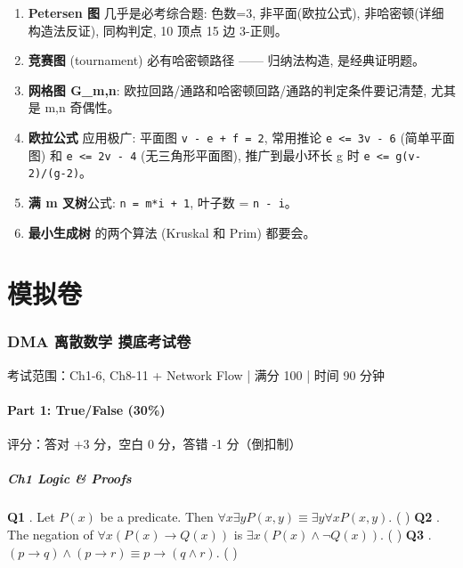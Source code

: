 \documentclass[10pt,a4paper,openany]{ctexbook}
\theoremstyle{definition}
\theoremstyle{remark}
\renewenvironment{quote}
  {\list{}{\leftmargin=1em\rightmargin=0pt\topsep=0.5pt\partopsep=0pt}\item[]}
  {\endlist}
\begin{document}
\begin{enumerate}
\item \textbf{Petersen 图} 几乎是必考综合题: 色数=3, 非平面(欧拉公式), 非哈密顿(详细构造法反证), 同构判定, 10 顶点 15 边 3-正则。
\item \textbf{竞赛图} (tournament) 必有哈密顿路径 —— 归纳法构造, 是经典证明题。
\item \textbf{网格图 G\_{m,n}}: 欧拉回路/通路和哈密顿回路/通路的判定条件要记清楚, 尤其是 m,n 奇偶性。
\item \textbf{欧拉公式} 应用极广: 平面图 \texttt{v - e + f = 2}, 常用推论 \texttt{e <= 3v - 6} (简单平面图) 和 \texttt{e <= 2v - 4} (无三角形平面图), 推广到最小环长 g 时 \texttt{e <= g(v-2)/(g-2)}。
\item \textbf{满 m 叉树}公式: \texttt{n = m*i + 1}, 叶子数 = \texttt{n - i}。
\item \textbf{最小生成树} 的两个算法 (Kruskal 和 Prim) 都要会。

\end{enumerate}

\part{模拟卷}

\section{DMA 离散数学 摸底考试卷}

\begin{quote}
考试范围：Ch1-6, Ch8-11 + Network Flow | 满分 100 | 时间 90 分钟

\end{quote}
\vspace{-2pt}

\subsection{Part 1: True/False (30\%)}

\begin{quote}
评分：答对 +3 分，空白 0 分，答错 -1 分（倒扣制）

\end{quote}

\subsubsection{Ch1 Logic \& Proofs}

\textbf{Q1} . Let $P(x)$ be a predicate. Then $\forall x \exists y P(x, y) \equiv \exists y \forall x P(x, y)$. ( )
\textbf{Q2} . The negation of $\forall x (P(x) \to Q(x))$ is $\exists x (P(x) \land \neg Q(x))$. ( )
\textbf{Q3} . $(p \to q) \land (p \to r) \equiv p \to (q \land r)$. ( )
\end{document}
